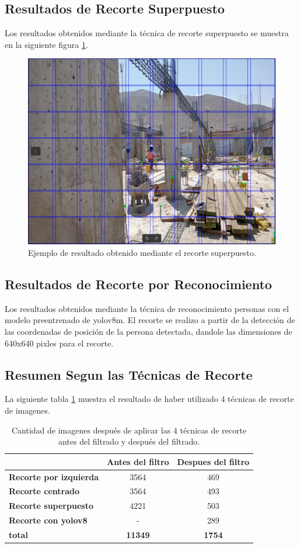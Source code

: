 \subsection{Resultados de Recorte Superpuesto}

Los resultados obtenidos mediante la técnica de recorte superpuesto se muestra en la siguiente figura \ref{fig:full_use}.

\begin{figure}[!ht]
  \centering
  \includegraphics[width=.49\linewidth]{images/full_use.png}
  \caption{Ejemplo de resultado obtenido mediante el recorte superpuesto.}
  \label{fig:full_use}
\end{figure}

\subsection{Resultados de Recorte por Reconocimiento}

Los resultados obtenidos mediante la técnica de reconocimiento personas con el modelo preentrenado de yolov8m. El recorte se realizo a partir de la detección de las coordenadas de posición de la persona detectada, dandole las dimensiones de 640x640 pixles para el recorte.

\subsection{Resumen Segun las Técnicas de Recorte}

La siguiente tabla \ref{tab:summary_table} muestra el resultado de haber utilizado 4 técnicas de recorte de imagenes.

\begin{table}[ht]
  \centering
  \begin{tabular}{|l|c|c|}
      \hline
       & \textbf{Antes del filtro}  & \textbf{Despues del filtro}\\ \hline
      \textbf{Recorte por izquierda} & 3564 & 469 \\ \hline
      \textbf{Recorte centrado} & 3564 & 493 \\ \hline
      \textbf{Recorte superpuesto} & 4221 & 503 \\ \hline
      \textbf{Recorte con yolov8} & - & 289 \\ \hline
      \textbf{total} & \textbf{11349} & \textbf{1754} \\ \hline
  \end{tabular}
  \caption{Cantidad de imagenes después de aplicar las 4 técnicas de recorte antes del filtrado y después del filtrado.}
  \label{tab:summary_table}
\end{table}

